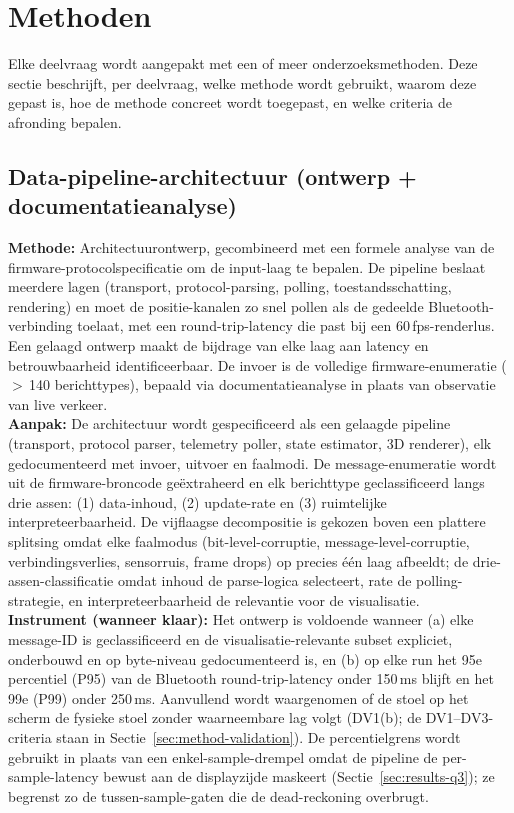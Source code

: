 \documentclass[10pt, a4paper, twocolumn]{article}
\begin{document}
\section{Methoden}
\label{sec:methods}

Elke deelvraag wordt aangepakt met een of meer onderzoeksmethoden. Deze sectie
beschrijft, per deelvraag, welke methode wordt gebruikt, waarom deze gepast is,
hoe de methode concreet wordt toegepast, en welke criteria de afronding bepalen.

\subsection{Data-pipeline-architectuur (ontwerp + documentatieanalyse)}
\label{sec:method-q1}
\textbf{Methode:} Architectuurontwerp, gecombineerd met een formele analyse van de
firmware-protocolspecificatie om de input-laag te bepalen. De pipeline beslaat
meerdere lagen (transport, protocol-parsing, polling, toestandsschatting,
rendering) en moet de positie-kanalen zo snel pollen als de gedeelde
Bluetooth-verbinding toelaat, met een round-trip-latency die past bij een
60\,fps-renderlus. Een gelaagd ontwerp maakt de bijdrage van elke laag aan
latency en betrouwbaarheid identificeerbaar. De invoer is de volledige
firmware-enumeratie ($>$\,140 berichttypes), bepaald via documentatieanalyse in
plaats van observatie van live verkeer.\\
\textbf{Aanpak:} De architectuur wordt gespecificeerd als een gelaagde pipeline
(transport, protocol parser, telemetry poller, state estimator, 3D renderer),
elk gedocumenteerd met invoer, uitvoer en faalmodi. De message-enumeratie wordt
uit de firmware-broncode geëxtraheerd en elk berichttype geclassificeerd langs
drie assen: (1) data-inhoud, (2) update-rate en (3) ruimtelijke
interpreteerbaarheid. De vijflaagse decompositie is gekozen boven een plattere
splitsing omdat elke faalmodus (bit-level-corruptie, message-level-corruptie,
verbindingsverlies, sensorruis, frame drops) op precies één laag afbeeldt; de
drie-assen-classificatie omdat inhoud de parse-logica selecteert, rate de
polling-strategie, en interpreteerbaarheid de relevantie voor de visualisatie.\\
\textbf{Instrument (wanneer klaar):} Het ontwerp is voldoende wanneer (a) elke
message-ID is geclassificeerd en de visualisatie-relevante subset expliciet,
onderbouwd en op byte-niveau gedocumenteerd is, en (b) op elke run het 95e
percentiel (P95) van de Bluetooth round-trip-latency onder 150\,ms blijft en het
99e (P99) onder 250\,ms. Aanvullend wordt waargenomen of de stoel op het scherm
de fysieke stoel zonder waarneembare lag volgt (DV1(b); de DV1--DV3-criteria
staan in Sectie~\ref{sec:method-validation}). De percentielgrens wordt gebruikt
in plaats van een enkel-sample-drempel omdat de pipeline de per-sample-latency
bewust aan de displayzijde maskeert (Sectie~\ref{sec:results-q3}); ze begrenst zo
de tussen-sample-gaten die de dead-reckoning overbrugt.
\end{document}
